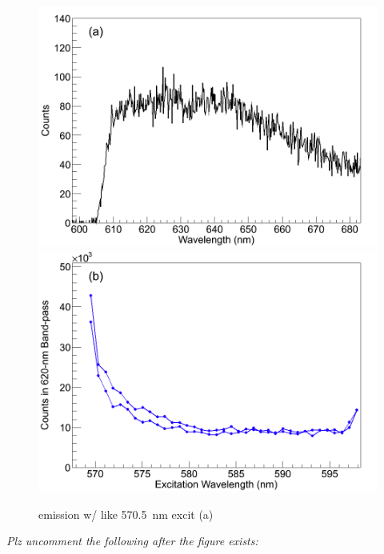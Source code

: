 
\begin{figure} %
        \centering
                \includegraphics[width=.7\textwidth]{figures/surfaceBG_a.png}
                \includegraphics[width=.7\textwidth]{figures/surfaceBG_b.png}
                \caption{emission w/ like 570.5~nm excit (a)}
\label{fig:surfBG}
\end{figure}

\emph{\color{red}Plz uncomment the following after the figure exists:}

